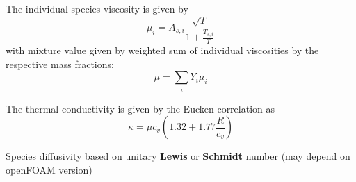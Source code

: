 \documentclass[a4paper, 12pt]{article}
\numberwithin{equation}{section}
\begin{document}
        The individual species viscosity is given by
        \begin{equation}
            \mu_i = A_{s,i} \frac{\sqrt{T}}{1 + \frac{T_{s,i}}{T}}
        \end{equation}
        with mixture value given by weighted sum of individual viscosities by the respective mass fractions:
        \begin{equation}
            \mu = \sum_i Y_i \mu_i
        \end{equation}

        The thermal conductivity is given by the Eucken correlation as
        \begin{equation}
            \kappa = \mu c_v \left( 1.32 + 1.77 \frac{R}{c_v} \right)
        \end{equation}

        Species diffusivity based on unitary \textbf{Lewis} or \textbf{Schmidt} number (may depend on openFOAM version)
\end{document}
